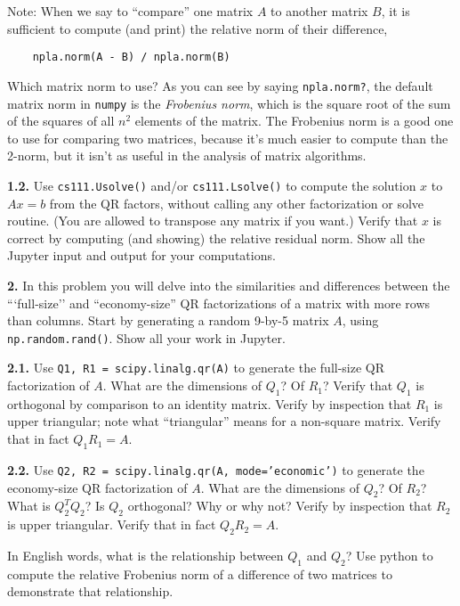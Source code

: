 \documentclass[11pt]{article}
\begin{document}
Note: When we say to ``compare'' one matrix $A$ to another matrix $B$, 
it is sufficient to compute (and print) the relative norm of their difference,
\begin{verbatim}
    npla.norm(A - B) / npla.norm(B)
\end{verbatim}
Which matrix norm to use? 
As you can see by saying {\tt npla.norm?}, 
the default matrix norm in {\tt numpy} is the {\em Frobenius norm}, 
which is the square root of the sum of the squares 
of all $n^2$ elements of the matrix.
The Frobenius norm is a good one to use for comparing two matrices, 
because it's much easier to compute than the 2-norm,
but it isn't as useful in the analysis of matrix algorithms.

\par\medskip
{\bf 1.2.}
Use {\tt cs111.Usolve()} and/or {\tt cs111.Lsolve()} to compute the solution $x$
to $Ax=b$ from the QR factors, without calling any other factorization or solve routine.
(You are allowed to transpose any matrix if you want.)
Verify that $x$ is correct by computing (and showing) the relative residual norm.
Show all the Jupyter input and output for your computations.

\par\bigskip
{\bf 2.}
In this problem you will delve into the similarities and differences 
between the ```full-size'' and ``economy-size'' QR factorizations of 
a matrix with more rows than columns.
Start by generating a random 9-by-5 matrix $A$, 
using {\tt np.random.rand()}.
Show all your work in Jupyter.

\par\medskip
{\bf 2.1.}
Use {\tt Q1, R1 = scipy.linalg.qr(A)} to generate the full-size QR
factorization of $A$.
What are the dimensions of $Q_1$? Of $R_1$?
Verify that $Q_1$ is orthogonal by comparison to an identity matrix.
Verify by inspection that $R_1$ is upper triangular; 
note what ``triangular'' means for a non-square matrix.
Verify that in fact $Q_1R_1=A$.

\par\medskip
{\bf 2.2.}
Use {\tt Q2, R2 = scipy.linalg.qr(A, mode='economic')} 
to generate the economy-size QR factorization of $A$.
What are the dimensions of $Q_2$? Of $R_2$?
What is $Q_2^TQ_2$?  Is $Q_2$ orthogonal? Why or why not?
Verify by inspection that $R_2$ is upper triangular.
Verify that in fact $Q_2R_2=A$.

In English words, what is the relationship between $Q_1$ and $Q_2$?  
Use python to compute the relative Frobenius norm of a difference of
two matrices to demonstrate that relationship.
\end{document}
